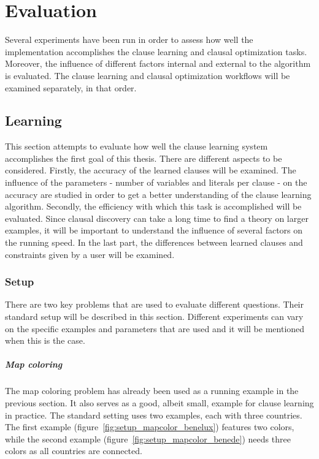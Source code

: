 \chapter{Evaluation}
\label{cha:evaluation}

Several experiments have been run in order to assess how well the implementation accomplishes the clause learning and clausal optimization tasks.
Moreover, the influence of different factors internal and external to the algorithm is evaluated.
The clause learning and clausal optimization workflows will be examined separately, in that order.

\section{Learning}

This section attempts to evaluate how well the clause learning system accomplishes the first goal of this thesis.
There are different aspects to be considered.
Firstly, the accuracy of the learned clauses will be examined.
The influence of the parameters - number of variables and literals per clause - on the accuracy are studied in order to get a better understanding of the clause learning algorithm.
Secondly, the efficiency with which this task is accomplished will be evaluated.
Since clausal discovery can take a long time to find a theory on larger examples, it will be important to understand the influence of several factors on the running speed.
In the last part, the differences between learned clauses and constraints given by a user will be examined.

\subsection{Setup}
There are two key problems that are used to evaluate different questions.
Their standard setup will be described in this section.
Different experiments can vary on the specific examples and parameters that are used and it will be mentioned when this is the case.

\paragraph{Map coloring}
The map coloring problem has already been used as a running example in the previous section.
It also serves as a good, albeit small, example for clause learning in practice.
The standard setting uses two examples, each with three countries.
The first example (figure~\ref{fig:setup_mapcolor_benelux}) features two colors, while the second example (figure~\ref{fig:setup_mapcolor_benede}) needs three colors as all countries are connected.

